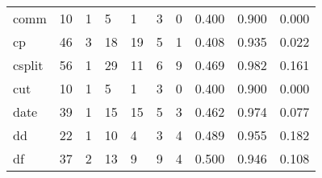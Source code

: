 \begin{longtable}{lp{2.0cm}p{2.0cm}p{2.0cm}p{2.0cm}p{2.0cm}p{2.0cm}p{2.0cm}p{2.0cm}p{2.0cm}}
comm      &                     10 &                                             1 &                                            5 &                                           1 &                                            3 &                                          0 &                                0.400 &                                  0.900 &                                0.000 \\
cp        &                     46 &                                             3 &                                           18 &                                          19 &                                            5 &                                          1 &                                0.408 &                                  0.935 &                                0.022 \\
csplit    &                     56 &                                             1 &                                           29 &                                          11 &                                            6 &                                          9 &                                0.469 &                                  0.982 &                                0.161 \\
cut       &                     10 &                                             1 &                                            5 &                                           1 &                                            3 &                                          0 &                                0.400 &                                  0.900 &                                0.000 \\
date      &                     39 &                                             1 &                                           15 &                                          15 &                                            5 &                                          3 &                                0.462 &                                  0.974 &                                0.077 \\
dd        &                     22 &                                             1 &                                           10 &                                           4 &                                            3 &                                          4 &                                0.489 &                                  0.955 &                                0.182 \\
df        &                     37 &                                             2 &                                           13 &                                           9 &                                            9 &                                          4 &                                0.500 &                                  0.946 &                                0.108 \\

\end{longtable}
